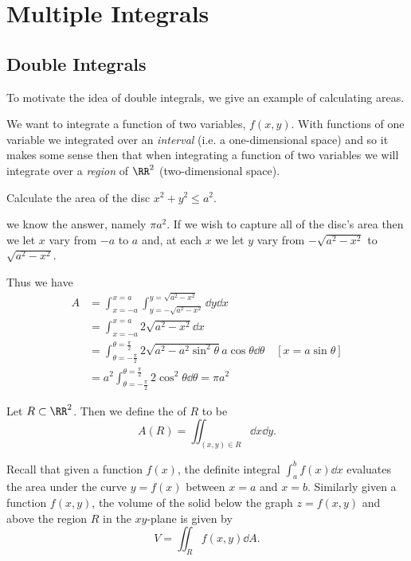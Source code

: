 \chapter{Multiple Integrals}
\section{Double Integrals}
To motivate the idea of double integrals, we give an example of calculating areas.

We want to integrate a function of two variables, $f(x,y)$. With functions of one variable we integrated over an \emph{interval} (i.e. a one-dimensional space) and so it makes some sense then that when integrating a function of two variables we will integrate over a \emph{region} of $\RR^2$ (two-dimensional space). 

\begin{exercise}
Calculate the area of the disc $x^2+y^2\le a^2$.
\end{exercise}

\begin{solution}
we know the answer, namely $\pi a^2$. If we wish to capture all of the disc's area then we let $x$ vary from $-a$ to $a$ and, at each $x$ we let $y$ vary from $-\sqrt{a^2-x^2}$ to $\sqrt{a^2-x^2}$.

Thus we have
\begin{align*}
A &= \int_{x=-a}^{x=a}\int_{y=-\sqrt{a^2-x^2}}^{y=\sqrt{a^2-x^2}}\dd{y}\dd{x} \\
&= \int_{x=-a}^{x=a}2\sqrt{a^2-x^2}\dd{x} \\
&= \int_{\theta=-\frac{\pi}{2}}^{\theta=\frac{\pi}{2}}2\sqrt{a^2-a^2\sin^2\theta}a\cos\theta\dd{\theta} \quad [x=a\sin\theta] \\
&= a^2\int_{\theta=-\frac{\pi}{2}}^{\theta=\frac{\pi}{2}}2\cos^2\theta\dd{\theta}=\pi a^2
\end{align*}
\end{solution}

\begin{definition}
Let $R\subset\RR^2$. Then we define the  of $R$ to be
\[ A(R)=\iint_{(x,y)\in R}\dd{x}\dd{y}. \]
\end{definition}


Recall that given a function $f(x)$, the definite integral $\int_a^bf(x)\dd{x}$ evaluates the area under the curve $y=f(x)$ between $x=a$ and $x=b$. Similarly given a function $f(x,y)$, the volume of the solid below the graph $z=f(x,y)$ and above the region $R$ in the $xy$-plane is given by 
\begin{equation}
V=\iint_Rf(x,y)\dd{A}.
\end{equation}

